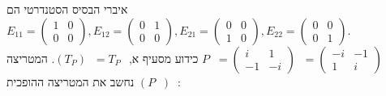 \documentclass{article}
\DeclareMathOperator{\adj}{^\ast}
\DeclareMathOperator{\inv}{^{-1}}
\begin{document}
איברי הבסיס הסטנדרטי הם $
    E_{11} = \begin{pmatrix}
        1 & 0 \\
        0 & 0
    \end{pmatrix},
    E_{12} = \begin{pmatrix}
        0 & 1 \\
        0 & 0
    \end{pmatrix},
    E_{21} = \begin{pmatrix}
        0 & 0 \\
        1 & 0
    \end{pmatrix},
    E_{22} = \begin{pmatrix}
        0 & 0 \\
        0 & 1
    \end{pmatrix}
$. \\
כידוע מסעיף א, $(T_P) \adj = T_{P\adj}$. המטריצה $P\adj = \begin{pmatrix}
        i  & 1  \\
        -1 & -i
    \end{pmatrix} \adj =
    \begin{pmatrix}
        -i & -1 \\
        1  & i
    \end{pmatrix}$ \\
נחשב את המטריצה ההופכית $(P\adj) \inv$:
\end{document}
